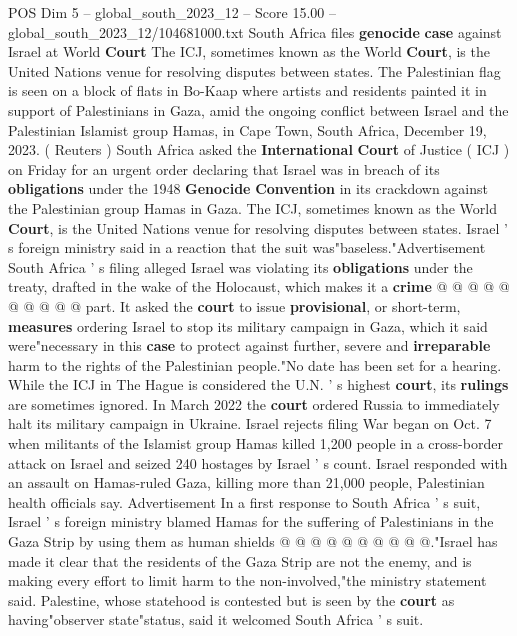 \begin{textsample}{POS Dim 5 – global\_south\_2023\_12 – Score 15.00 – global\_south\_2023\_12/104681000.txt}  \label{ex:f5_pos_108}
South Africa files \textbf{genocide} \textbf{case} against Israel at World \textbf{Court} The ICJ, sometimes known as the World \textbf{Court}, is the United Nations venue for resolving disputes between states.
The Palestinian flag is seen on a block of flats in Bo-Kaap where artists and residents painted it in support of Palestinians in Gaza, amid the ongoing conflict between Israel and the Palestinian Islamist group Hamas, in Cape Town, South Africa, December 19, 2023. ( Reuters ) South Africa asked the \textbf{International} \textbf{Court} of Justice ( ICJ ) on Friday for an urgent order declaring that Israel was in breach of its \textbf{obligations} under the 1948 \textbf{Genocide} \textbf{Convention} in its crackdown against the Palestinian group Hamas in Gaza.
The ICJ, sometimes known as the World \textbf{Court}, is the United Nations venue for resolving disputes between states.
Israel ' s foreign ministry said in a reaction that the suit was"baseless."Advertisement South Africa ' s filing alleged Israel was violating its \textbf{obligations} under the treaty, drafted in the wake of the Holocaust, which makes it a \textbf{crime} @ @ @ @ @ @ @ @ @ @ part.
It asked the \textbf{court} to issue \textbf{provisional}, or short-term, \textbf{measures} ordering Israel to stop its military campaign in Gaza, which it said were"necessary in this \textbf{case} to protect against further, severe and \textbf{irreparable} harm to the rights of the Palestinian people."No date has been set for a hearing.
While the ICJ in The Hague is considered the U.N. ' s highest \textbf{court}, its \textbf{rulings} are sometimes ignored.
In March 2022 the \textbf{court} ordered Russia to immediately halt its military campaign in Ukraine.
Israel rejects filing War began on Oct. 7 when militants of the Islamist group Hamas killed 1,200 people in a cross-border attack on Israel and seized 240 hostages by Israel ' s count.
Israel responded with an assault on Hamas-ruled Gaza, killing more than 21,000 people, Palestinian health officials say.
Advertisement In a first response to South Africa ' s suit, Israel ' s foreign ministry blamed Hamas for the suffering of Palestinians in the Gaza Strip by using them as human shields @ @ @ @ @ @ @ @ @ @."Israel has made it clear that the residents of the Gaza Strip are not the enemy, and is making every effort to limit harm to the non-involved,"the ministry statement said.
Palestine, whose statehood is contested but is seen by the \textbf{court} as having"observer state"status, said it welcomed South Africa ' s suit.

\end{textsample}
